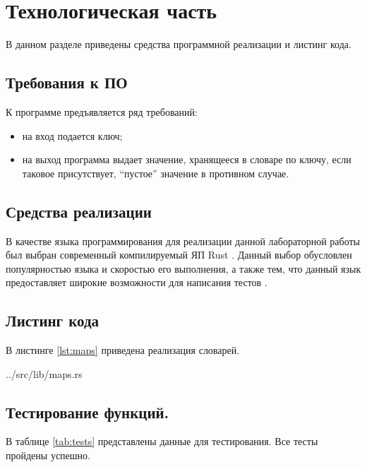 \chapter{Технологическая часть}

В данном разделе приведены средства программной реализации и листинг кода.

\section{Требования к ПО}

К программе предъявляется ряд требований:
\begin{itemize}
    \item на вход подается ключ;
    \item на выход программа выдает значение, хранящееся в словаре по ключу, если таковое присутствует, ``пустое'' значение в противном случае.
\end{itemize}

\section{Средства реализации}

В качестве языка программирования для реализации данной лабораторной работы был выбран современный компилируемый ЯП Rust \cite{rustlang}. Данный выбор обусловлен популярностью языка и скоростью его выполнения, а также тем, что данный язык предоставляет широкие возможности для написания тестов \cite{rusttest}.

\section{Листинг кода}

В листинге \ref{lst:maps} приведена реализация словарей.

\begin{lstinputlisting}[
	caption={Реализация словарей.},
	label={lst:maps},
	style={rust}
]{../src/lib/maps.rs}
\end{lstinputlisting}

\section{Тестирование функций.}

В таблице \ref{tab:tests} представлены данные для тестирования. Все тесты пройдены успешно.


